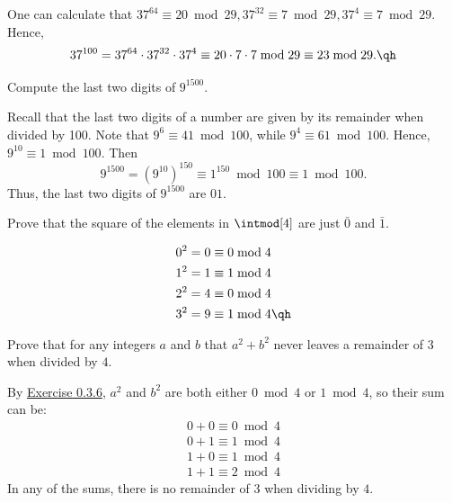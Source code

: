 \begin{sol}
    One can calculate that $37^{64} \equiv 20 \bmod 29, 37^{32} \equiv 7 \bmod 29, 37^4 \equiv 7 \bmod 29$. Hence,
    \[37^{100} = 37^{64} \cdot 37^{32} \cdot 37^4 \equiv 20 \cdot 7 \cdot 7 \bmod 29 \equiv 23 \bmod 29. \qh\]
\end{sol}

\begin{exercise}\label{ex0.3.5}
    Compute the last two digits of $9^{1500}$.
\end{exercise}

\begin{sol}
    Recall that the last two digits of a number are given by its remainder when divided by 100. Note that $9^6 \equiv 41 \bmod 100$, while $9^4 \equiv 61 \bmod 100$. Hence, $9^{10} \equiv 1 \bmod 100$. Then
    \[9^{1500} = (9^{10})^{150} \equiv 1^{150} \bmod 100 \equiv 1 \bmod 100. \]
    Thus, the last two digits of $9^{1500}$ are $01$.
\end{sol}

\begin{exercise} \label{ex0.3.6}
    Prove that the square of the elements in $\intmod[4]$ are just $\bar 0$ and $\bar 1$.
\end{exercise}

\begin{sol}
    \begin{align*}
        0^2 & = 0 \equiv 0 \bmod 4 \\
        1^2 & = 1 \equiv 1 \bmod 4 \\
        2^2 & = 4 \equiv 0 \bmod 4 \\
        3^2 & = 9 \equiv 1 \bmod 4 \qh
    \end{align*}
\end{sol}

\begin{exercise} \label{ex0.3.7}
    Prove that for any integers $a$ and $b$ that $a^2 + b^2$ never leaves a remainder of $3$ when divided by $4$.

\end{exercise}

\begin{sol}
    By \hyperref[ex0.3.6]{Exercise 0.3.6}, $a^2$ and $b^2$ are both either $0 \bmod 4$ or $1 \bmod 4$, so their sum can be:
    \begin{align*}
        0 + 0 \equiv 0 \bmod 4 \\
        0 + 1 \equiv 1 \bmod 4 \\
        1 + 0 \equiv 1 \bmod 4 \\
        1 + 1 \equiv 2 \bmod 4
    \end{align*}
    In any of the sums, there is no remainder of $3$ when dividing by $4$.
\end{sol}

